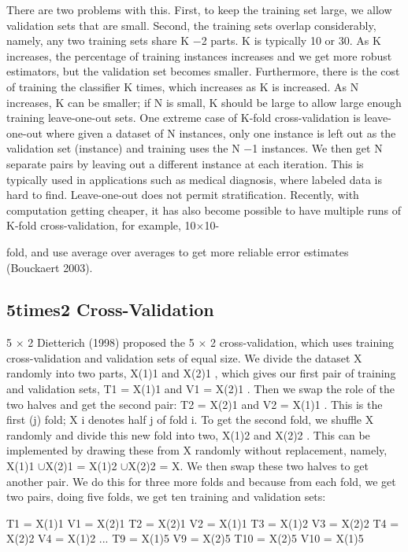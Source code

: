 There are two problems with this. First, to keep the training set large, we allow validation sets that are small. Second, the training sets overlap considerably, namely, any two training sets share K $-$2 parts. K is typically 10 or 30. As K increases, the percentage of training instances increases and we get more robust estimators, but the validation set becomes smaller. Furthermore, there is the cost of training the classifier K times, which increases as K is increased. As N increases, K can be smaller; if N is small, K should be large to allow large enough training leave-one-out sets. One extreme case of K-fold cross-validation is leave-one-out where given a dataset of N instances, only one instance is left out as the validation set (instance) and training uses the N $-$1 instances. We then get N separate pairs by leaving out a different instance at each iteration. This is typically used in applications such as medical diagnosis, where labeled data is hard to find. Leave-one-out does not permit stratification. Recently, with computation getting cheaper, it has also become possible to have multiple runs of K-fold cross-validation, for example, 10$\times$10-

fold, and use average over averages to get more reliable error estimates (Bouckaert 2003).

\subsection{5times2 Cross-Validation}

5 $\times$ 2 Dietterich (1998) proposed the 5 $\times$ 2 cross-validation, which uses training cross-validation and validation sets of equal size. We divide the dataset X randomly into two parts, X(1)1 and X(2)1 , which gives our first pair of training and validation sets, T1 = X(1)1 and V1 = X(2)1 . Then we swap the role of the two halves and get the second pair: T2 = X(2)1 and V2 = X(1)1 . This is the first (j) fold; X i denotes half j of fold i. To get the second fold, we shuffle X randomly and divide this new fold into two, X(1)2 and X(2)2 . This can be implemented by drawing these from X randomly without replacement, namely, X(1)1 $\cup$X(2)1 = X(1)2 $\cup$X(2)2 = X. We then swap these two halves to get another pair. We do this for three more folds and because from each fold, we get two pairs, doing five folds, we get ten training and validation sets:

T1 = X(1)1 V1 = X(2)1 T2 = X(2)1 V2 = X(1)1 T3 = X(1)2 V3 = X(2)2 T4 = X(2)2 V4 = X(1)2 ... T9 = X(1)5 V9 = X(2)5 T10 = X(2)5 V10 = X(1)5

